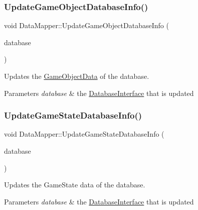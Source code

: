 \subsubsection{\texorpdfstring{Update\+Game\+Object\+Database\+Info()}{UpdateGameObjectDatabaseInfo()}}
{\footnotesize\ttfamily void Data\+Mapper\+::\+Update\+Game\+Object\+Database\+Info (\begin{DoxyParamCaption}\item[{std\+::shared\+\_\+ptr$<$ \hyperlink{class_database_interface}{Database\+Interface} $>$}]{database }\end{DoxyParamCaption})\hspace{0.3cm}{\ttfamily [private]}}



Updates the \hyperlink{struct_game_object_data}{Game\+Object\+Data} of the database. 


\begin{DoxyParams}{Parameters}
{\em database} & the \hyperlink{class_database_interface}{Database\+Interface} that is updated \\
\hline
\end{DoxyParams}
\mbox{\label{class_data_mapper_aefb6246f9bf9fc9974cd52a1b46d165e}} 
\subsubsection{\texorpdfstring{Update\+Game\+State\+Database\+Info()}{UpdateGameStateDatabaseInfo()}}
{\footnotesize\ttfamily void Data\+Mapper\+::\+Update\+Game\+State\+Database\+Info (\begin{DoxyParamCaption}\item[{std\+::shared\+\_\+ptr$<$ \hyperlink{class_database_interface}{Database\+Interface} $>$}]{database }\end{DoxyParamCaption})\hspace{0.3cm}{\ttfamily [private]}}



Updates the Game\+State data of the database. 


\begin{DoxyParams}{Parameters}
{\em database} & the \hyperlink{class_database_interface}{Database\+Interface} that is updated \\
\hline
\end{DoxyParams}
\mbox{\label{class_data_mapper_ade3e27146120b3cb74d556e8b9e48526}} 
